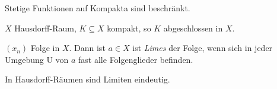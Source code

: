 \begin{kor}
Stetige Funktionen auf Kompakta sind beschränkt.
\end{kor}
\begin{kor}
$X$ Hausdorff-Raum, $K \subseteq X$ kompakt, so $K$ abgeschlossen in $X$.
\end{kor}


\begin{defi}[Limes]
$(x_n)$ Folge in $X$. Dann ist $a \in X$ ist \emph{Limes} der Folge, wenn sich in jeder Umgebung U von $a$ fast alle Folgenglieder befinden.
\end{defi}
\begin{bem}
In Hausdorff-Räumen sind Limiten eindeutig.
\end{bem}

